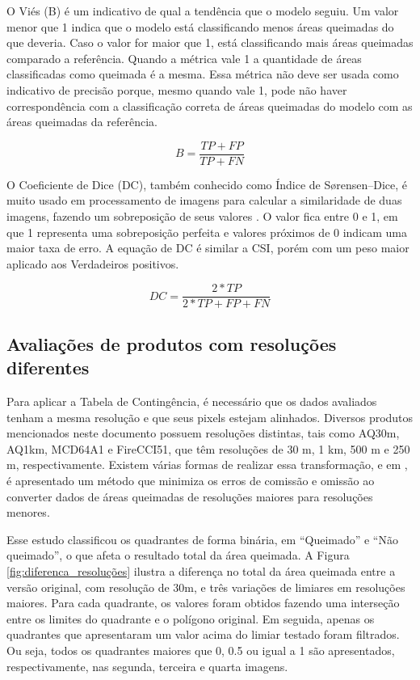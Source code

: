 \documentclass[cic,tc]{iiufrgs}
\begin{document}
O Viés (B) é um indicativo de qual a tendência que o modelo seguiu. Um valor menor que 1 indica que o modelo está classificando menos áreas queimadas do que deveria. Caso o valor for maior que 1, está classificando mais áreas queimadas comparado a referência. Quando a métrica vale 1 a quantidade de áreas classificadas como queimada é a mesma. Essa métrica não deve ser usada como indicativo de precisão porque, mesmo quando vale 1, pode não haver correspondência com a classificação correta de áreas queimadas do modelo com as áreas queimadas da referência.

\begin{equation} \label{eqn:def_b}
  B = \frac{TP + FP}{TP + FN}
\end{equation}

O Coeficiente de Dice (DC), também conhecido como Índice de Sørensen–Dice, é muito usado em processamento de imagens para calcular a similaridade de duas imagens, fazendo um sobreposição de seus valores \citep{livro-dice}. O valor fica entre 0 e 1, em que 1 representa uma sobreposição perfeita e valores próximos de 0 indicam uma maior taxa de erro. A equação de DC é similar a CSI, porém com um peso maior aplicado aos Verdadeiros positivos.

\begin{equation} \label{eqn:def_dc}
  DC = \frac{2 * TP}{2 * TP + FP + FN}
\end{equation}

\subsection*{Avaliações de produtos com resoluções diferentes}

Para aplicar a Tabela de Contingência, é necessário que os dados avaliados tenham a mesma resolução e que seus pixels estejam alinhados. Diversos produtos mencionados neste documento possuem resoluções distintas, tais como AQ30m, AQ1km, MCD64A1 e FireCCI51, que têm resoluções de 30 m, 1 km, 500 m e 250 m, respectivamente. Existem várias formas de realizar essa transformação, e em \citet{BOSCHETTI2004280}, é apresentado um método que minimiza os erros de comissão e omissão ao converter dados de áreas queimadas de resoluções maiores para resoluções menores.

Esse estudo classificou os quadrantes de forma binária, em ``Queimado'' e ``Não queimado'', o que afeta o resultado total da área queimada. A Figura \ref{fig:diferenca_resoluções} ilustra a diferença no total da área queimada entre a versão original, com resolução de 30m, e três variações de limiares em resoluções maiores. Para cada quadrante, os valores foram obtidos fazendo uma interseção entre os limites do quadrante e o polígono original. Em seguida, apenas os quadrantes que apresentaram um valor acima do limiar testado foram filtrados. Ou seja, todos os quadrantes maiores que 0, 0.5 ou igual a 1 são apresentados, respectivamente, nas segunda, terceira e quarta imagens.
\end{document}
